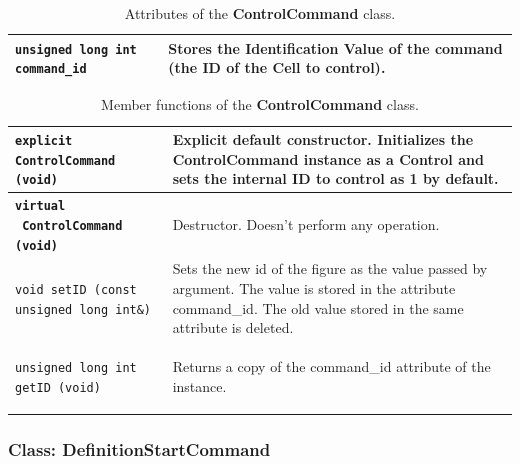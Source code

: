 \documentclass[11pt,twoside,openany,x11names,svgnames]{memoir}
\begin{document}
\begin{table}[h]\footnotesize
\centering
\begin{tabular}{| >{\bfseries}p{6.5cm} | p{9cm} |}
	\hline
	
	\texttt{unsigned long int command\_id} & Stores the Identification Value of the command (the ID of the Cell to control). \\

	\hline
\end{tabular}
\caption{Attributes of the \textbf{ControlCommand} class.}
\label{tab:ControlCommand-Attributes}
\end{table}

\begin{table}[h]\footnotesize
\centering
\begin{tabular}{| >{\bfseries}p{8.5cm} | p{7cm} |}
	\hline
	
	\texttt{explicit ControlCommand (void)} & Explicit default constructor. Initializes the ControlCommand instance as a Control and sets the internal ID to control as 1 by default. \\
	
	\hline
	
	\texttt{virtual ~ControlCommand (void)} & Destructor. Doesn't perform any operation. \\
	
	\hline
	
	\texttt{void setID (const unsigned long int\&)} & Sets the new id of the figure as the value passed by argument. The value is stored in the attribute command\_id. The old value stored in the same attribute is deleted. \\
	
	\hline	
	
	\texttt{unsigned long int getID (void)} & Returns a copy of the command\_id attribute of the instance. \\
	
	\hline
\end{tabular}
\caption{Member functions of the \textbf{ControlCommand} class.}
\label{tab:ControlCommand-MemberFunctions}
\end{table}

\clearpage

\subsubsection{Class: DefinitionStartCommand}\label{Class-DefinitionStartCommand}
\end{document}
